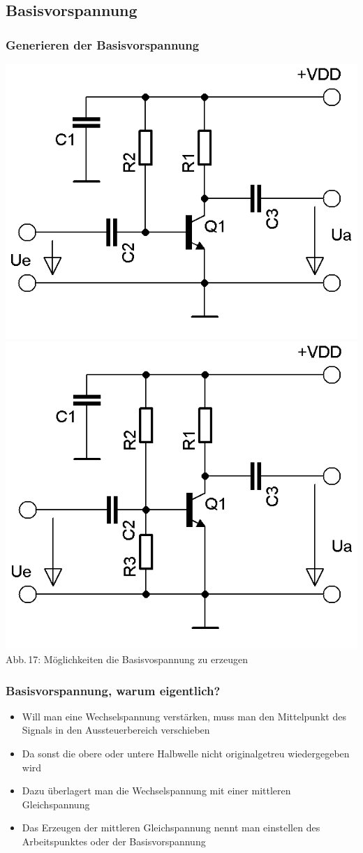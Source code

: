 \subsection*{Basisvorspannung}
\begin{frame}
  \frametitle{Generieren der Basisvorspannung}
	\begin{center}
		\includegraphics[width=.4\textwidth,height=.85\textheight,keepaspectratio]{a06/Transistor-Verstaerker.png}
		\vspace{3mm}
		\includegraphics[width=.4\textwidth,height=.85\textheight,keepaspectratio]{a06/Transistor-Verstaerker-C.png}\\
		{\tiny Abb.\,17: Möglichkeiten die Basisvospannung zu erzeugen}
	\end{center}
\end{frame}

\begin{frame}
	\frametitle{Basisvorspannung, warum eigentlich?}
	\begin{itemize}
		\item Will man eine Wechselspannung verstärken, muss man den Mittelpunkt des Signals in den Aussteuerbereich verschieben
		\item Da sonst die obere oder untere Halbwelle nicht originalgetreu wiedergegeben wird
		\item Dazu überlagert man die Wechselspannung mit einer mittleren Gleichspannung
		\item Das Erzeugen der mittleren Gleichspannung nennt man einstellen des Arbeitspunktes oder der Basisvorspannung
	\end{itemize}
\end{frame}


